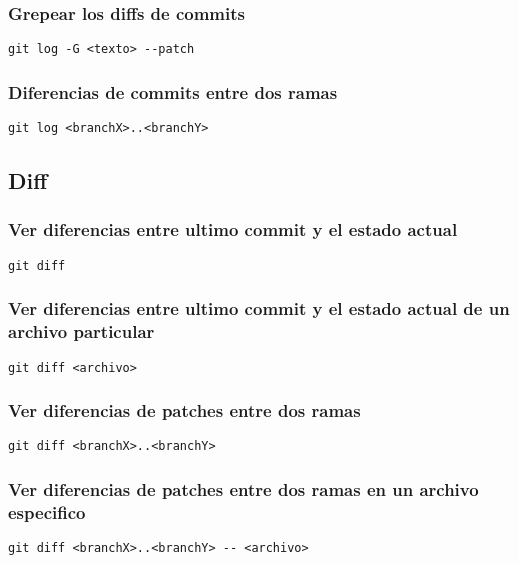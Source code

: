 \documentclass[11pt]{article}
\begin{document}
\subsubsection{Grepear los diffs de commits}
\label{sec:orga1b6122}
\begin{verbatim}
git log -G <texto> --patch
\end{verbatim}

\subsubsection{Diferencias de commits entre dos ramas}
\label{sec:orga40611a}
\begin{verbatim}
git log <branchX>..<branchY>
\end{verbatim}

\subsection{Diff}
\label{sec:org0524783}
\subsubsection{Ver diferencias entre ultimo commit y el estado actual}
\label{sec:org6950fed}
\begin{verbatim}
git diff
\end{verbatim}

\subsubsection{Ver diferencias entre ultimo commit y el estado actual de un archivo particular}
\label{sec:orgd8abda5}
\begin{verbatim}
git diff <archivo>
\end{verbatim}

\subsubsection{Ver diferencias de patches entre dos ramas}
\label{sec:orgb52b3e0}
\begin{verbatim}
git diff <branchX>..<branchY>
\end{verbatim}

\subsubsection{Ver diferencias de patches entre dos ramas en un archivo especifico}
\label{sec:orgfe8ec16}
\begin{verbatim}
git diff <branchX>..<branchY> -- <archivo>
\end{verbatim}
\end{document}
